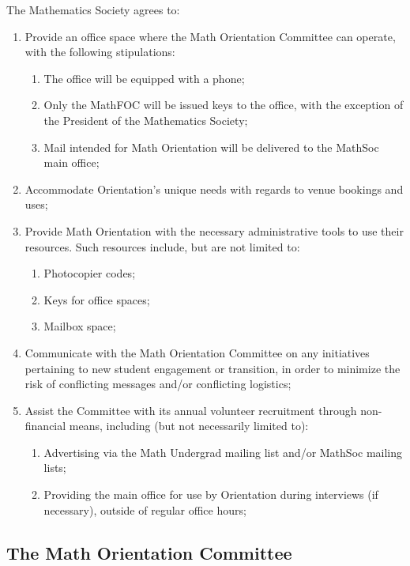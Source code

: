 \documentclass[12pt, letterpaper]{mathsoc}
\begin{document}
The Mathematics Society agrees to:
\begin{enumerate}
    \item Provide an office space where the Math Orientation Committee can operate, with the following stipulations:
    \begin{enumerate}
    \item The office will be equipped with a phone;
    \item Only the MathFOC will be issued keys to the office, with the exception of the President of the Mathematics Society;
    \item Mail intended for Math Orientation will be delivered to the MathSoc main office;
    \end{enumerate}
    \item Accommodate Orientation’s unique needs with regards to venue bookings and uses;
    \item Provide Math Orientation with the necessary administrative tools to use their resources. Such resources include, but are not limited to:
    \begin{enumerate}
    \item Photocopier codes;
    \item Keys for office spaces;
    \item Mailbox space;
    \end{enumerate}
    \item Communicate with the Math Orientation Committee on any initiatives pertaining to new student engagement or transition, in order to minimize the risk of conflicting messages and/or conflicting logistics;
    \item Assist the Committee with its annual volunteer recruitment through non-financial means, including (but not necessarily limited to):
    \begin{enumerate}
    \item Advertising via the Math Undergrad mailing list and/or MathSoc mailing lists;
    \item Providing the main office for use by Orientation during interviews (if necessary), outside of regular office hours;
    \end{enumerate}
\end{enumerate}

\subsection{The Math Orientation Committee}
\end{document}
